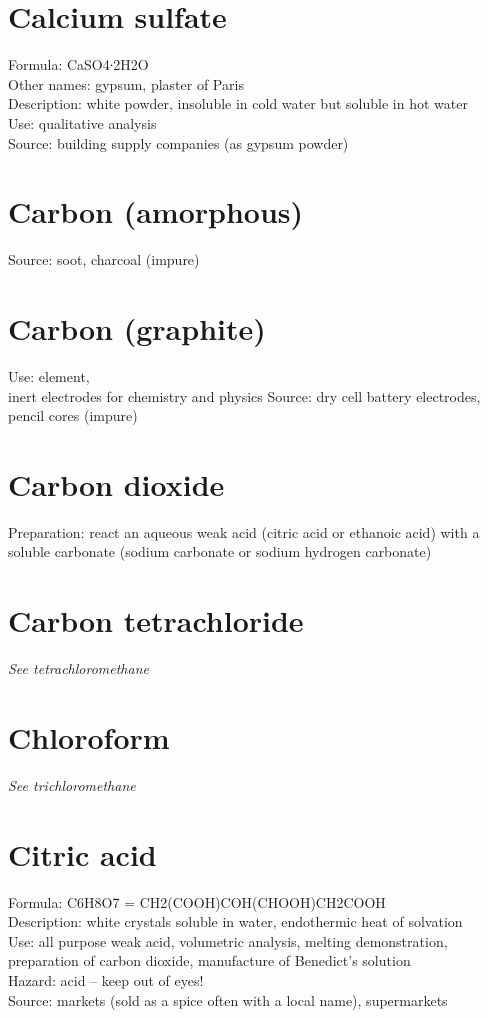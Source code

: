 \section{Calcium sulfate}
Formula: CaSO4∙2H2O\\
Other names: gypsum, 
plaster of Paris\\
Description: white powder, 
insoluble in cold water but soluble in hot water\\
Use: qualitative analysis\\
Source: building supply companies (as gypsum powder)

\section{Carbon (amorphous)}
Source: soot, 
charcoal (impure)

\section{Carbon (graphite)}
Use: element, \\
inert electrodes for chemistry and physics
Source: dry cell battery electrodes, 
pencil cores (impure)

\section{Carbon dioxide}
Preparation: react an aqueous weak acid 
(citric acid or ethanoic acid) with a soluble carbonate 
(sodium carbonate or sodium hydrogen carbonate)

\section{Carbon tetrachloride}
\textit{See tetrachloromethane}

\section{Chloroform}
\textit{See trichloromethane}

\section{Citric acid}
Formula: C6H8O7 =  CH2(COOH)COH(CHOOH)CH2COOH\\
Description: white crystals soluble in water, 
endothermic heat of solvation\\
Use: all purpose weak acid, 
volumetric analysis, 
melting demonstration, 
preparation of carbon dioxide, 
manufacture of Benedict's solution\\
Hazard: acid – keep out of eyes!\\
Source: markets (sold as a spice often with a local name), 
supermarkets

